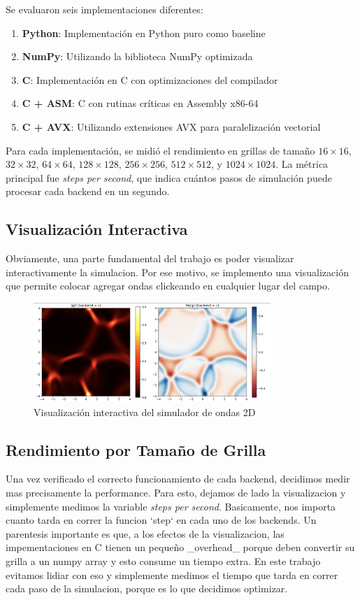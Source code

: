 \documentclass[a4paper]{article}
\begin{document}
Se evaluaron seis implementaciones diferentes:
\begin{enumerate}
    \item \textbf{Python}: Implementación en Python puro como baseline
    \item \textbf{NumPy}: Utilizando la biblioteca NumPy optimizada
    \item \textbf{C}: Implementación en C con optimizaciones del compilador
    \item \textbf{C + ASM}: C con rutinas críticas en Assembly x86-64
    \item \textbf{C + AVX}: Utilizando extensiones AVX para paralelización vectorial
\end{enumerate}

Para cada implementación, se midió el rendimiento en grillas de tamaño $16 \times 16$, $32 \times 32$, $64 \times 64$, $128 \times 128$, $256 \times 256$, $512 \times 512$, y $1024 \times 1024$. La métrica principal fue \textit{steps per second}, que indica cuántos pasos de simulación puede procesar cada backend en un segundo.



\subsection{Visualización Interactiva}
Obviamente, una parte fundamental del trabajo es poder visualizar interactivamente la simulacion. Por ese motivo, se implemento una visualización que permite colocar
agregar ondas clickeando en cualquier lugar del campo.

\begin{figure}[h]
    \centering
    \includegraphics[width=0.8\textwidth]{extra/live_visualization.png}
    \caption{Visualización interactiva del simulador de ondas 2D}
    \label{fig:live_visualization}
\end{figure}

\subsection{Rendimiento por Tamaño de Grilla}
Una vez verificado el correcto funcionamiento de cada backend, decidimos medir mas precisamente la performance. Para esto, dejamos de lado la visualizacion y simplemente
medimos la variable \textit{steps per second}. Basicamente, nos importa cuanto tarda en correr la funcion `step` en cada uno de los backends. Un parentesis importante es
que, a los efectos de la visualizacion, las impementaciones en C tienen un pequeño _overhead_ porque deben convertir su grilla a un numpy array y esto consume un tiempo extra.
En este trabajo evitamos lidiar con eso y simplemente medimos el tiempo que tarda en correr cada paso de la simulacion, porque es lo que decidimos optimizar.
\end{document}
